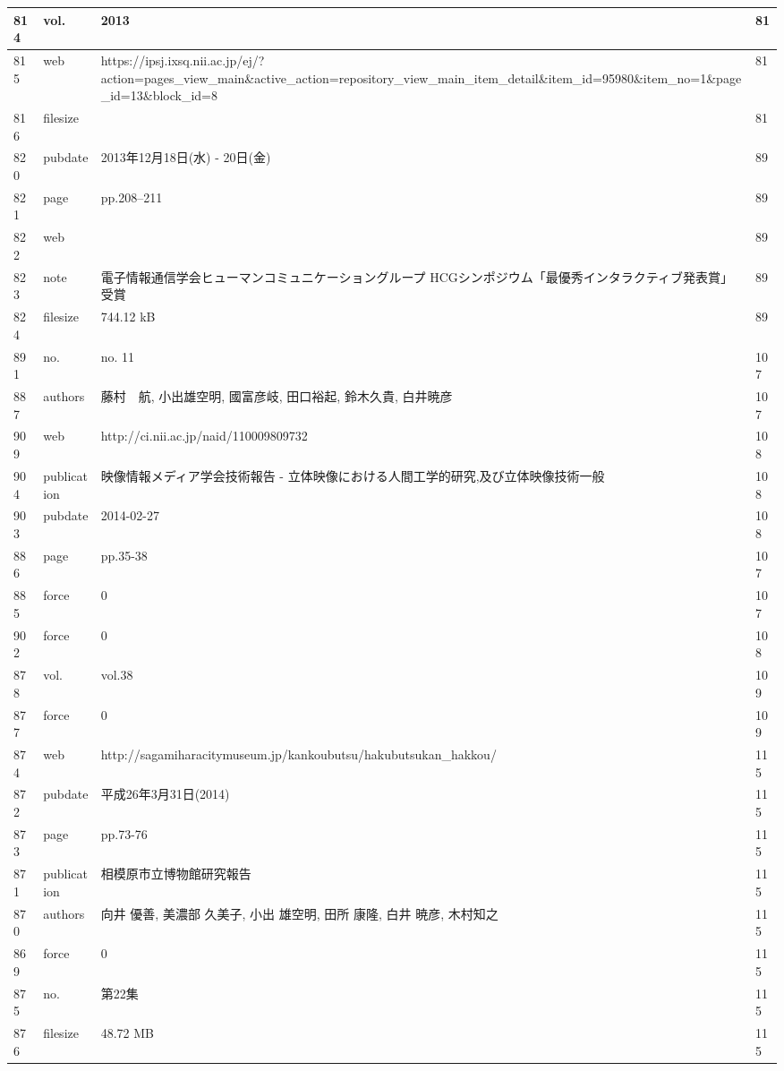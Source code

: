 \begin{longtable}{|l|l|l|l|}
814 & vol. & 2013 & 81 \\ \hline 
815 & web & https://ipsj.ixsq.nii.ac.jp/ej/?action=pages\_view\_main\&active\_action=repository\_view\_main\_item\_detail\&item\_id=95980\&item\_no=1\&page\_id=13\&block\_id=8 & 81 \\ \hline 
816 & filesize &  & 81 \\ \hline 
820 & pubdate & 2013年12月18日(水) - 20日(金) & 89 \\ \hline 
821 & page & pp.208--211 & 89 \\ \hline 
822 & web &  & 89 \\ \hline 
823 & note & 電子情報通信学会ヒューマンコミュニケーショングループ HCGシンポジウム「最優秀インタラクティブ発表賞」受賞 & 89 \\ \hline 
824 & filesize & 744.12 kB & 89 \\ \hline 
891 & no. & no. 11 & 107 \\ \hline 
887 & authors & 藤村　航, 小出雄空明, 國富彦岐, 田口裕起, 鈴木久貴, 白井暁彦 & 107 \\ \hline 
909 & web & http://ci.nii.ac.jp/naid/110009809732 & 108 \\ \hline 
904 & publication & 映像情報メディア学会技術報告 - 立体映像における人間工学的研究,及び立体映像技術一般 & 108 \\ \hline 
903 & pubdate & 2014-02-27 & 108 \\ \hline 
886 & page & pp.35-38 & 107 \\ \hline 
885 & force & 0 & 107 \\ \hline 
902 & force & 0 & 108 \\ \hline 
878 & vol. & vol.38 & 109 \\ \hline 
877 & force & 0 & 109 \\ \hline 
874 & web & http://sagamiharacitymuseum.jp/kankoubutsu/hakubutsukan\_hakkou/ & 115 \\ \hline 
872 & pubdate & 平成26年3月31日(2014) & 115 \\ \hline 
873 & page & pp.73-76 & 115 \\ \hline 
871 & publication & 相模原市立博物館研究報告 & 115 \\ \hline 
870 & authors & 向井 優善, 美濃部 久美子, 小出 雄空明, 田所 康隆, 白井 暁彦, 木村知之 & 115 \\ \hline 
869 & force & 0 & 115 \\ \hline 
875 & no. & 第22集 & 115 \\ \hline 
876 & filesize & 48.72 MB & 115 \\ \hline 

\end{longtable}
